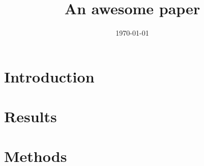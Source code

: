 \documentclass[12pt]{article} %
\def\figdir{figs}
\begin{document}

\title{An awesome paper} %
\date{\today}
\maketitle %

\section{Introduction} %
\label{sec:introduction}


\section{Results} %
\label{sec:results}



\section{Methods} %
\label{sec:methods}


\printbibliography
    
\end{document}

